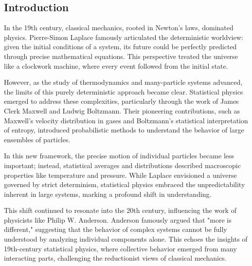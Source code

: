 \documentclass[ansiapaper]{report}
\author{Andrea}
\begin{document}



\fontsize{9}{10}\selectfont%

\renewcommand{\contentsname}{Contents} %


\vskip6pt
\begin{center}
	\noindent {}
\end{center}
\vskip9pt

\begin{multicols}{3}

	\renewcommand{\baselinestretch}{1.1}\normalsize %
	{\footnotesize \sffamily \tableofcontents} %



	\renewcommand{\baselinestretch}{1.0}\normalsize

	\fontsize{9}{10}\selectfont
	\chapter{Introduction}
	In the 19th century, classical mechanics, rooted in Newton’s laws, dominated physics. Pierre-Simon Laplace famously articulated the deterministic worldview: given the initial conditions of a system, its future could be perfectly predicted through precise mathematical equations. This perspective treated the universe like a clockwork machine, where every event followed from the initial state.

	However, as the study of thermodynamics and many-particle systems advanced, the limits of this purely deterministic approach became clear. Statistical physics emerged to address these complexities, particularly through the work of James Clerk Maxwell and Ludwig Boltzmann. Their pioneering contributions, such as Maxwell's velocity distribution in gases and Boltzmann's statistical interpretation of entropy, introduced probabilistic methods to understand the behavior of large ensembles of particles.

	In this new framework, the precise motion of individual particles became less important; instead, statistical averages and distributions described macroscopic properties like temperature and pressure. While Laplace envisioned a universe governed by strict determinism, statistical physics embraced the unpredictability inherent in large systems, marking a profound shift in understanding.

	This shift continued to resonate into the 20th century, influencing the work of physicists like Philip W. Anderson. Anderson famously argued that "more is different," suggesting that the behavior of complex systems cannot be fully understood by analyzing individual components alone. This echoes the insights of 19th-century statistical physics, where collective behavior emerged from many interacting parts, challenging the reductionist views of classical mechanics.


\end{multicols}
\end{document}
